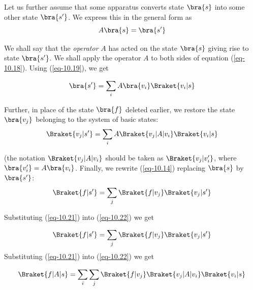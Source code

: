 \documentclass[a4paper,sfsidenotes,colorlinks=true]{tufte-book}
\numberwithin{equation}{section}
\numberwithin{figure}{section}
\begin{document}
Let us further assume that some apparatus converts state $\bra{s}$ into
some other state $\bra{s'}$. We express this in the general form as 
\begin{equation}%
A \bra{s} = \bra{s'} 
\label{eq-10.19} 
\end{equation}

We shall say that the \emph{operator} $A$ has acted on the state $\bra{s}$ giving
rise to state  $\bra{s'}$. We shall apply the operator $A$ to both sides of
equation (\ref{eq-10.18}). Using (\ref{eq-10.19}), we get

\begin{equation}%
\bra{s'} = \sum_{i} A \bra{v_{i}} \Braket{v_{i} | s}
\label{eq-10.20} 
\end{equation}

Further, in place of the state $\bra{f}$ deleted earlier, we restore the
state $\bra{v_{j}}$ belonging to the system of basic states:
\begin{equation}%
\Braket{v_{j} | s'} = \sum_{i} A \Braket{v_{j}|A|v_{i}} \Braket{v_{i} | s}
\label{eq-10.21} 
\end{equation}

(the notation $\Braket{v_{j}|A|v_{i}}$ should be taken as
$\Braket{v_{j}|v_{i}'}$, where $\bra{v_{i}'} = A
\bra{v_{i}}$. Finally, we rewrite (\ref{eq-10.14}) replacing $\bra{s}$
by $\bra{s'}$: 
\begin{equation}%
\Braket{f | s'} = \sum_{j} \Braket{f|v_{j}} \Braket{v_{j} | s'}
\label{eq-10.22} 
\end{equation}
         
Substituting (\ref{eq-10.21}) into (\ref{eq-10.22}) we get 

\begin{equation}%
\Braket{f | s'} = \sum_{j} \Braket{f|v_{j}} \Braket{v_{j} | s'}
\label{eq-10.22} 
\end{equation}
Substituting (\ref{eq-10.21}) into (\ref{eq-10.22}) we get

\begin{equation}%
\Braket{f | A| s} = \sum_{i} \sum_{j} \Braket{f|v_{j}} \Braket{v_{j}
  |A| v_{i}} \Braket{v_{i}|s}
\label{eq-10.23} 
\end{equation}
\end{document}
